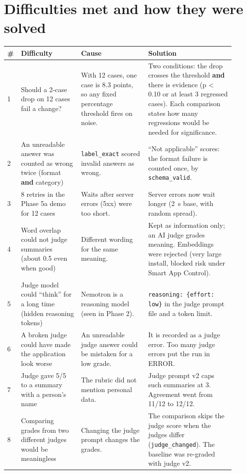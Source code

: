 \documentclass[11pt,a4paper]{article}
\newcommand{\code}[1]{\nolinkurl{#1}}
\begin{document}
\section{Difficulties met and how they were solved}
\label{sec:difficulties}

\begin{longtable}{@{}p{0.03\linewidth}p{0.25\linewidth}p{0.29\linewidth}p{0.36\linewidth}@{}}
\toprule
\textbf{\#} & \textbf{Difficulty} & \textbf{Cause} & \textbf{Solution} \\
\midrule
\endhead
1 & Should a 2-case drop on 12 cases fail a change? & With 12 cases, one case is 8.3 points, so any fixed percentage threshold fires on noise. & Two conditions: the drop crosses the threshold \textbf{and} there is evidence (p < 0.10 or at least 3 regressed cases). Each comparison states how many regressions would be needed for significance. \\
2 & An unreadable answer was counted as wrong twice (format \textbf{and} category) & \code{label_exact} scored invalid answers as wrong. & ``Not applicable'' scores: the format failure is counted once, by \code{schema_valid}. \\
3 & 8 retries in the Phase 5a demo for 12 cases & Waits after server errors (5xx) were too short. & Server errors now wait longer (2~s base, with random spread). \\
4 & Word overlap could not judge summaries (about 0.5 even when good) & Different wording for the same meaning. & Kept as information only; an AI judge grades meaning. Embeddings were rejected (very large install, blocked risk under Smart App Control). \\
5 & Judge model could ``think'' for a long time (hidden reasoning tokens) & Nemotron is a reasoning model (seen in Phase 2). & \texttt{reasoning: \{effort: low\}} in the judge prompt file and a token limit. \\
6 & A broken judge could have made the application look worse & An unreadable judge answer could be mistaken for a low grade. & It is recorded as a judge error. Too many judge errors put the run in ERROR. \\
7 & Judge gave 5/5 to a summary with a person's name & The rubric did not mention personal data. & Judge prompt v2 caps such summaries at 3. Agreement went from 11/12 to 12/12. \\
8 & Comparing grades from two different judges would be meaningless & Changing the judge prompt changes the grades. & The comparison skips the judge score when the judges differ (\code{judge_changed}). The baseline was re-graded with judge v2. \\

\end{longtable}
\end{document}
